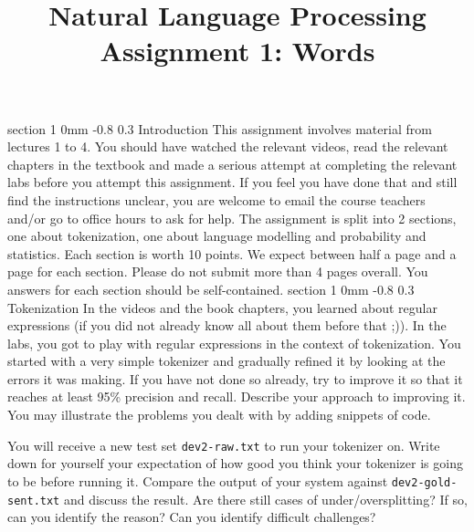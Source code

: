 \documentclass[11pt]{article}
\title{{\LARGE Natural Language Processing}\\[1.5mm]{\large Assignment 1: Words}}
\author{}
\date{} %
\makeatletter
\renewcommand{\section}{\@startsection
{section}%
{1}%
{0mm}%
{-0.8\baselineskip}%
{0.3\baselineskip}%
{\bfseries\large}}%
\makeatother
\begin{document}


\maketitle
\section{Introduction}
\indent This assignment involves material from lectures 1 to 4. You
should have watched the relevant videos, read the relevant chapters in
the textbook and made a serious attempt at completing the relevant
labs before you attempt this assignment.  If you feel you have done
that and still find the instructions unclear, you are welcome to email
the course teachers and/or go to office hours to ask for help.  The
assignment is split into 2 sections, one about tokenization, one about
language modelling and probability and statistics. Each section is
worth 10 points. We expect between half a page and a page for each
section. Please do not submit more than 4 pages overall.  You answers
for each section should be self-contained.
\section{Tokenization}
In the videos and the book chapters, you learned about regular expressions (if
you did not already know all about them before that ;)). In the labs, you got
to play with regular expressions in the context of tokenization.
You started with a very simple tokenizer and gradually refined it by looking at
the errors it was making. 
If you have not done so already, try to improve it so that it reaches at least
95\% precision and recall.  
Describe your approach to improving it. You may illustrate the problems you
dealt with by adding snippets of code.

You will receive a new test set {\tt dev2-raw.txt} to run your tokenizer on.  
Write down for yourself your expectation of how good you think your tokenizer
is going to be before running it.  
Compare the output of your system against {\tt dev2-gold-sent.txt} and discuss
the result. Are there still cases of under/oversplitting? If so, can you
identify the reason? Can you identify difficult challenges?
\end{document}
